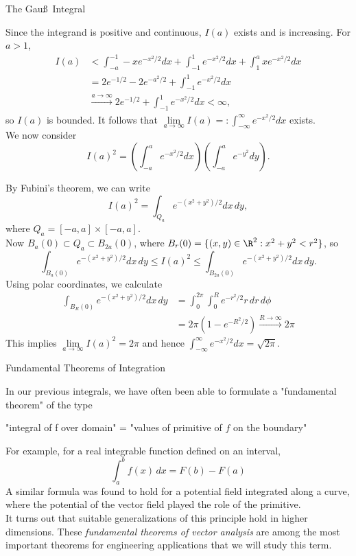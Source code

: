 \documentclass[smaller,hyperref={CJKbookmarks=true}]{beamer}
\begin{document}
\begin{frame}{The Gau\ss~Integral}
\begin{spacing}{1}
Since the integrand is positive and continuous, $I(a)$ exists and is increasing. For $a>1$,
\begin{equation*}
  \begin{split}
     I(a) &<\int_{-a}^{-1}-xe^{-x^2/2}dx+\int_{-1}^{1}e^{-x^2/2}dx
     +\int_{1}^{a}xe^{-x^2/2}dx \\
       &=2e^{-1/2}-2e^{-a^2/2}+\int_{-1}^{1}e^{-x^2/2}dx \\
       &\xrightarrow[]{a\to\infty}2e^{-1/2}+\int_{-1}^{1}e^{-x^2/2}dx
       <\infty,
  \end{split}
\end{equation*}
so $I(a)$ is bounded. It follows that $\lim\limits_{a\to\infty}I(a)=:\int_{-\infty}^{\infty}
e^{-x^2/2}dx$ exists.\\[5pt]
We now consider
\[I(a)^2=\left(\int_{-a}^{a}e^{-x^2/2}dx\right)\left(\int_{-a}^{a}
e^{-y^2}dy\right).\]
\end{spacing}
\newpage
\begin{spacing}{0.7}
By Fubini's theorem, we can write
\[I(a)^2=\int_{Q_a}e^{-(x^2+y^2)/2}dx\,dy,\]
where $Q_a=[-a,a]\times[-a,a]$.\\
Now $B_a(0)\subset Q_a\subset B_{2a}(0)$, where $B_r(0)=\{(x,y)\in\R^2:x^2+y^2<r^2\}$, so
\[\int_{B_a(0)}e^{-(x^2+y^2)/2}dx\,dy\leq
I(a)^2\leq\int_{B_{2a}(0)}e^{-(x^2+y^2)/2}dx\,dy.\]
Using polar coordinates, we calculate
\begin{equation*}
  \begin{split}
     \int_{B_R(0)}e^{-(x^2+y^2)/2}dx\,dy &=\int_{0}^{2\pi}\int_{0}^{R}e^{-r^2/2}r\,dr\,d\phi \\
       &=2\pi(1-e^{-R^2/2})\xrightarrow[]{R\to\infty}2\pi
  \end{split}
\end{equation*}
This implies $\lim\limits_{a\to\infty}I(a)^2=2\pi$ and hence $\int_{-\infty}^{\infty}e^{-x^2/2}dx=\sqrt{2\pi}.$
\end{spacing}
\end{frame}
\begin{frame}[t]{Fundamental Theorems of Integration}
\begin{spacing}{1.1}
In our previous integrals, we have often been able to formulate a
"fundamental theorem" of the type\\[3pt]
\begin{center}
  "integral of f over domain" = "values of primitive of $f$ on the boundary"
\end{center}
For example, for a real integrable function defined on an interval,
\[\int_{a}^{b}f(x)\,dx=F(b)-F(a)\]
A similar formula was found to hold for a potential field integrated along a
curve, where the potential of the vector field played the role of the
primitive.\\[4pt]
It turns out that suitable generalizations of this principle hold in higher
dimensions. These \emph{fundamental theorems of vector analysis} are among the
most important theorems for engineering applications that we will study
this term.
\end{spacing}
\end{frame}
\end{document}
